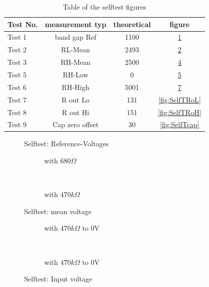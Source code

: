 \begin{table}[H]
  \begin{center}
    \begin{tabular}{| l | c | c | c |}
    \hline
Test No. & measurement typ & theoretical & figure \\
    \hline
    \hline
Test 1 & band gap Ref  & 1100 & \ref{fig:SelfTref} \\
    \hline
Test 2 & RL-Mean & 2493 & \ref{fig:SelfTMitL} \\
    \hline
Test 3 & RH-Mean & 2500 & \ref{fig:SelfTMitH} \\
    \hline
Test 5 & RH-Low &  0 & \ref{fig:SelfTlowH} \\
    \hline
Test 6 & RH-High & 5001 & \ref{fig:SelfTtopH} \\
    \hline
Test 7 & R out Lo & 131 & \ref{fig:SelfTRoL} \\
    \hline
Test 8 & R out Hi & 151 & \ref{fig:SelfTRoH} \\
    \hline
Test 9 & Cap zero offset & 30 & \ref{fig:SelfTcap} \\
    \hline
    \end{tabular}
  \end{center}
  \caption{Table of the selftest figures }
  \label{tab:test_m168} 
\end{table}

\begin{figure}[H]
\centering

\caption{Selftest: Reference-Voltages}
\label{fig:SelfTref}
\end{figure}


\begin{figure}[H]
  \begin{subfigure}[b]{9cm}
    \centering
    \resizebox{9cm}{!}{}
    \caption{with \(680 \Omega\)}
    \label{fig:SelfTMitL}
  \end{subfigure}
  ~
  \begin{subfigure}[b]{9cm}
    \centering
    \resizebox{9cm}{!}{}
    \caption{with \(470 k\Omega\)}
    \label{fig:SelfTMitH}
  \end{subfigure}
  \caption{Selftest: mean voltage}
\end{figure}

\begin{figure}[H]
  \begin{subfigure}[b]{9cm}
  \centering
    \resizebox{9cm}{!}{}
    \caption{with \(470 k\Omega\) to 0V}
    \label{fig:SelfTlowH}
  \end{subfigure}
  ~
  \begin{subfigure}[b]{9cm}
  \centering
    \resizebox{9cm}{!}{}
    \caption{with \(470 k\Omega\) to 0V}
    \label{fig:SelfTtopH}
  \end{subfigure}
  \caption{Selftest: Input voltage}
\end{figure}

